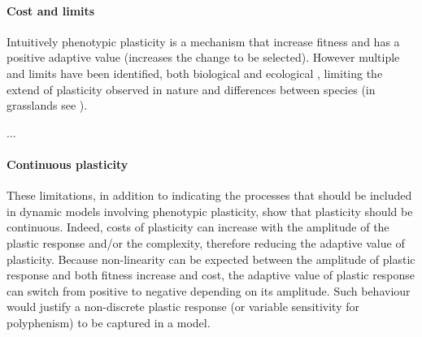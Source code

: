 {%


\paragraph{Cost and limits}

Intuitively phenotypic plasticity is a mechanism that increase fitness and has a positive adaptive value (increases the change to be selected). However multiple  and limits have been identified, both biological \parencite{ dewitt_cost_1998, auld_re-evaluating_2009, callahan_phenotypic_2008} and ecological \parencite{dewitt_cost_1998, auld_re-evaluating_2009, scheiner_genetics_1989, scheiner_genetics_2002 ,scheiner_genetics_2012, van_kleunen_constraints_2005}, limiting the extend of plasticity observed in nature and differences between species (in grasslands see \cite{ryser_consequences_2000}).

...



\paragraph{Continuous plasticity}
These limitations, in addition to indicating the processes that should be included in dynamic models involving phenotypic plasticity, show that plasticity should be continuous. Indeed, costs of plasticity can increase with the amplitude of the plastic response and/or the complexity, therefore reducing the adaptive value of plasticity. Because non-linearity can be expected between the amplitude of plastic response and both fitness increase and cost, the adaptive value of plastic response can switch from positive to negative depending on its amplitude. Such behaviour would justify a non-discrete plastic response (or variable sensitivity for polyphenism) to be captured in a model.
%
%


%
%


}
